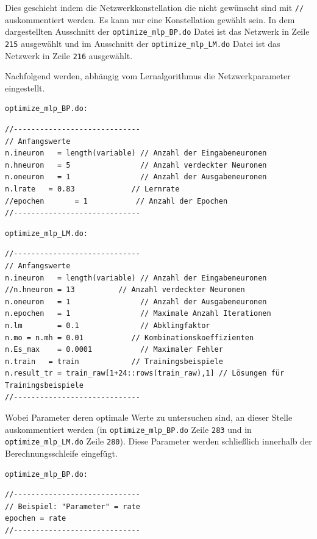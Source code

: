 Dies geschieht indem die Netzwerkkonstellation die nicht gewünscht sind mit \verb|//| auskommentiert werden. Es kann nur eine Konstellation gewählt sein. In dem dargestellten Ausschnitt der \verb|optimize_mlp_BP.do| Datei ist das Netzwerk in Zeile \verb|215| ausgewählt und im Ausschnitt der \verb|optimize_mlp_LM.do| Datei ist das Netzwerk in Zeile \verb|216| ausgewählt.

Nachfolgend werden, abhängig vom Lernalgorithmus die Netzwerkparameter eingestellt.

\begin{Verbatim}
optimize_mlp_BP.do:
\end{Verbatim}
{
\begin{lstlisting}[firstnumber=278]
//-----------------------------
// Anfangswerte
n.ineuron	= length(variable) // Anzahl der Eingabeneuronen
n.hneuron	= 5                // Anzahl verdeckter Neuronen
n.oneuron	= 1                // Anzahl der Ausgabeneuronen
n.lrate   = 0.83             // Lernrate
//epochen		= 1           // Anzahl der Epochen
//-----------------------------
\end{lstlisting}
}

\begin{Verbatim}
optimize_mlp_LM.do:
\end{Verbatim}
{
\begin{lstlisting}[firstnumber=278]
//-----------------------------
// Anfangswerte
n.ineuron	= length(variable) // Anzahl der Eingabeneuronen
//n.hneuron	= 13          // Anzahl verdeckter Neuronen
n.oneuron	= 1                // Anzahl der Ausgabeneuronen
n.epochen	= 1                // Maximale Anzahl Iterationen
n.lm		= 0.1              // Abklingfaktor
n.mo = n.mh = 0.01           // Kombinationskoeffizienten
n.Es_max	= 0.0001           // Maximaler Fehler
n.train   = train            // Trainingsbeispiele
n.result_tr = train_raw[1+24::rows(train_raw),1] // Lösungen für Trainingsbeispiele
//-----------------------------
\end{lstlisting}
}

Wobei Parameter deren optimale Werte zu untersuchen sind, an dieser Stelle auskommentiert werden (in \verb|optimize_mlp_BP.do| Zeile \verb|283| und in \verb|optimize_mlp_LM.do| Zeile \verb|280|).
Diese Parameter werden schließlich innerhalb der Berechnungsschleife eingefügt.

\begin{Verbatim}
optimize_mlp_BP.do:
\end{Verbatim}
{
\begin{lstlisting}[firstnumber=300]
//-----------------------------
// Beispiel: "Parameter" = rate
epochen	= rate
//-----------------------------
\end{lstlisting}
}

